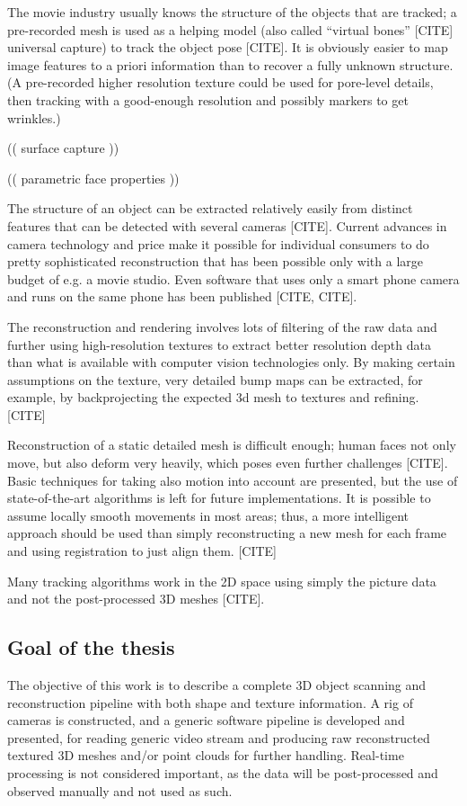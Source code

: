 The movie industry usually knows the structure of the objects that are tracked; a pre-recorded mesh is used as a helping model (also called ``virtual bones'' [CITE] universal capture) to track the object pose [CITE].
It is obviously easier to map image features to a priori information than to recover a fully unknown structure.
(A pre-recorded higher resolution texture could be used for pore-level details, then tracking with a good-enough resolution and possibly markers to get wrinkles.)

(( surface capture ))

(( parametric face properties ))

The structure of an object can be extracted relatively easily from distinct features that can be detected with several cameras [CITE].
Current advances in camera technology and price make it possible for individual consumers to do pretty sophisticated reconstruction that has been possible only with a large budget of e.g. a movie studio.
Even software that uses only a smart phone camera and runs on the same phone has been published [CITE, CITE].

The reconstruction and rendering involves lots of filtering of the raw data and further using high-resolution textures to extract better resolution depth data than what is available with computer vision technologies only.
By making certain assumptions on the texture, very detailed bump maps can be extracted, for example, by backprojecting the expected 3d mesh to textures and refining. [CITE]

Reconstruction of a static detailed mesh is difficult enough; human faces not only move, but also deform very heavily, which poses even further challenges [CITE].
Basic techniques for taking also motion into account are presented, but the use of state-of-the-art algorithms is left for future implementations.
It is possible to assume locally smooth movements in most areas; thus, a more intelligent approach should be used than simply reconstructing a new mesh for each frame and using registration to just align them. [CITE]

Many tracking algorithms work in the 2D space using simply the picture data and not the post-processed 3D meshes [CITE].


\subsection{Goal of the thesis}

The objective of this work is to describe a complete 3D object scanning and reconstruction pipeline with both shape and texture information.
A rig of cameras is constructed, and a generic software pipeline is developed and presented, for reading generic video stream and producing raw reconstructed textured 3D meshes and/or point clouds for further handling.
Real-time processing is not considered important, as the data will be post-processed and observed manually and not used as such.

